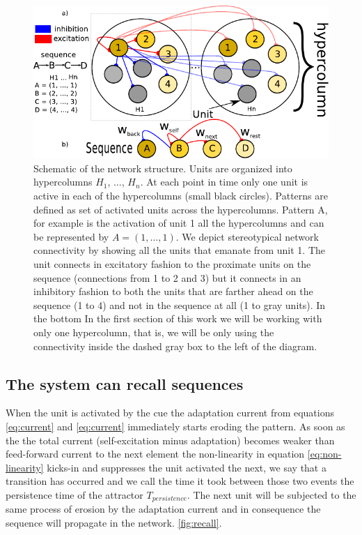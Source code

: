 \documentclass[10pt,a4paper]{article}
\begin{document}
\begin{figure}[H]
\centering
\includegraphics[scale=1.0]{diagram.pdf}
\caption{Schematic of the network structure. Units are organized into hypercolumns $H_1$, $\ldots$, $H_n$. At each point in time only one unit is active in each of the hypercolumns (small black circles). Patterns are defined as set of activated units across the hypercolumns. Pattern A, for example is the activation of unit 1 all the hypercolumns and can be represented by $A=(1, \ldots, 1)$. We depict stereotypical network connectivity by showing all the units that emanate from unit 1. The unit connects in excitatory fashion to the proximate units on the sequence (connections from 1 to 2 and 3) but it connects in an inhibitory fashion to both the units that are farther ahead on the sequence (1 to 4) and not in the sequence at all (1 to gray units). In the bottom In the first section of this work we will be working with only one hypercolumn, that is, we will be only using the connectivity inside the dashed gray box to the left of the diagram.}
\label{fig:networks_scheme}
\end{figure}




\subsection{The system can recall sequences}


When the unit is activated by the cue the adaptation current from equations \ref{eq:current} and \ref{eq:current} immediately starts eroding the pattern. As soon as the the total current (self-excitation minus adaptation) becomes weaker than feed-forward current to the next element the non-linearity in equation \ref{eq:non-linearity} kicks-in and suppresses the unit activated the next, we say that a transition has occurred and we call the time it took between those two events the persistence time of the attractor $T_{persistence}$. The next unit will be subjected to the same process of erosion by the adaptation current and in consequence the sequence will propagate in the network. \ref{fig:recall}. 
\end{document}
